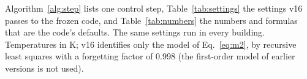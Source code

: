 \documentclass{article}
\begin{document}
Algorithm~\ref{alg:step} lists one control step, Table~\ref{tab:settings} the settings v16 passes to the frozen
code, and Table~\ref{tab:numbers} the numbers and formulas that are the code's defaults. The same settings run in
every building. Temperatures in K; v16 identifies only the model of Eq.~\ref{eq:m2}, by recursive least squares with
a forgetting factor of 0.998 (the first-order model of earlier versions is not used).
\end{document}
